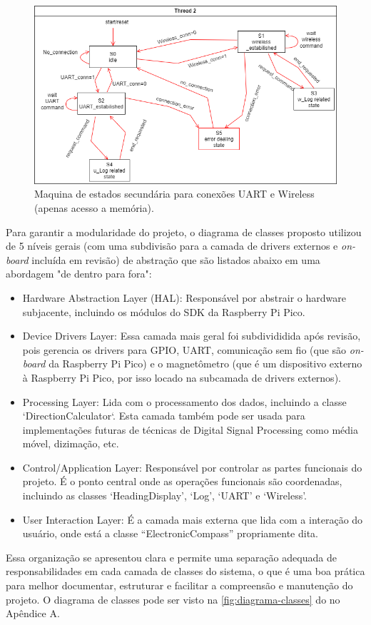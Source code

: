 \documentclass[10pt,twocolumn,letterpaper]{article}
\begin{document}
\begin{figure}[h]
  \centering
  \includegraphics[width=\linewidth]{figures/maquina_estados2.2.png}
  \caption{Maquina de estados secundária para conexões UART e Wireless (apenas acesso a memória).}
  \label{fig:maquina_estados2}
\end{figure}


Para garantir a modularidade do projeto, o diagrama de classes proposto utilizou de 5 níveis gerais (com uma subdivisão para a camada de drivers externos e \emph{on-board} incluída em revisão) de abstração que são listados abaixo em uma abordagem "de dentro para fora":
\begin{itemize}
  \item Hardware Abstraction Layer (HAL): Responsável por abstrair o hardware subjacente, incluindo os módulos do SDK da Raspberry Pi Pico.
  \item Device Drivers Layer: Essa camada mais geral foi subdivididida após revisão, pois gerencia os drivers para GPIO, UART, comunicação sem fio (que são \emph{on-board} da Raspberry Pi Pico) e o magnetômetro (que é um dispositivo externo à Raspberry Pi Pico, por isso locado na subcamada de drivers externos).
  \item Processing Layer: Lida com o processamento dos dados, incluindo a classe `DirectionCalculator`. Esta camada também pode ser usada 
  para implementações futuras de técnicas de Digital Signal Processing como média móvel, dizimação, etc.
  \item Control/Application Layer: Responsável por controlar as partes funcionais do projeto. É o ponto central onde as operações 
  funcionais são coordenadas, incluindo as classes `HeadingDisplay', `Log', `UART' e `Wireless'. 
  \item User Interaction Layer: É a camada mais externa que lida com a interação do usuário, onde está a classe ``ElectronicCompass'' propriamente dita.
\end{itemize}
Essa organização se apresentou clara e permite uma separação adequada de responsabilidades em cada camada de classes do sistema, 
o que é uma boa prática para melhor documentar, estruturar e facilitar a compreensão e manutenção do projeto. O diagrama de classes 
pode ser visto na \autoref{fig:diagrama-classes} do no Apêndice A.
\end{document}
